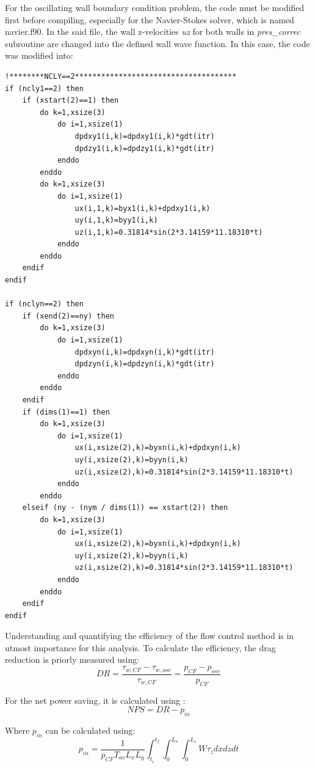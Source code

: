 For the oscillating wall boundary condition problem, the code must be modified first before compiling, especially for the Navier-Stokes solver, which is named navier.f90. In the said file, the wall z-velocities \textit{uz} for both walls in \textit{pres\_correc} subroutine are changed into the defined wall wave function. In this case, the code was modified into:
\begin{verbatim}
!********NCLY==2*************************************
if (ncly1==2) then
	if (xstart(2)==1) then
		do k=1,xsize(3)
			do i=1,xsize(1)
				dpdxy1(i,k)=dpdxy1(i,k)*gdt(itr)
				dpdzy1(i,k)=dpdzy1(i,k)*gdt(itr)
			enddo
		enddo
		do k=1,xsize(3)
			do i=1,xsize(1)
				ux(i,1,k)=byx1(i,k)+dpdxy1(i,k)
				uy(i,1,k)=byy1(i,k)
				uz(i,1,k)=0.31814*sin(2*3.14159*11.18310*t)
			enddo
		enddo
	endif
endif
	
if (nclyn==2) then
	if (xend(2)==ny) then
		do k=1,xsize(3)
			do i=1,xsize(1)
				dpdxyn(i,k)=dpdxyn(i,k)*gdt(itr)
				dpdzyn(i,k)=dpdzyn(i,k)*gdt(itr)
			enddo
		enddo
	endif
	if (dims(1)==1) then
		do k=1,xsize(3)
			do i=1,xsize(1)
				ux(i,xsize(2),k)=byxn(i,k)+dpdxyn(i,k)
				uy(i,xsize(2),k)=byyn(i,k)
				uz(i,xsize(2),k)=0.31814*sin(2*3.14159*11.18310*t)
			enddo
		enddo
	elseif (ny - (nym / dims(1)) == xstart(2)) then
		do k=1,xsize(3)
			do i=1,xsize(1)
				ux(i,xsize(2),k)=byxn(i,k)+dpdxyn(i,k)
				uy(i,xsize(2),k)=byyn(i,k)
				uz(i,xsize(2),k)=0.31814*sin(2*3.14159*11.18310*t)
			enddo
		enddo
	endif
endif
\end{verbatim}

Understanding and quantifying the efficiency of the flow control method is in utmost importance for this analysis. To calculate the efficiency, the drag reduction is priorly measured using:
\begin{equation}
	DR = \frac{\tau_{w,CF} - \tau_{w,osc}}{\tau_{w,CF}} = \frac{p_{CF} - p_{osc}}{p_{CF}}
\end{equation}

For the net power saving, it is calculated using \cite{Marusic2021}:
\begin{equation}
	NPS = DR - p_{in}
\end{equation} 

Where $p_{in}$ can be calculated using:
\begin{equation}
	p_{in} = \frac{1}{p_{CF}T_{av}L_x L_y} \int_{t_i}^{t_f} \int_{0}^{L_x} \int_{0}^{L_z} W \tau_z dx dz dt
\end{equation}




